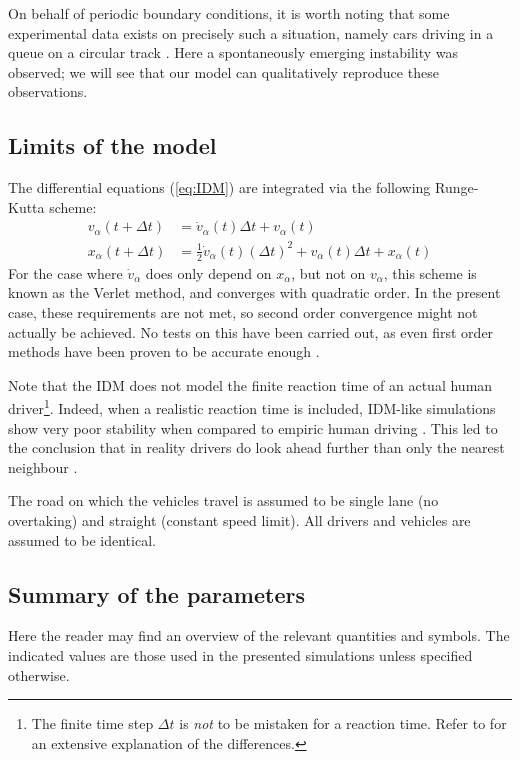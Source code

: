On behalf of periodic boundary conditions, it is worth noting that some experimental data exists on precisely such a situation, namely cars driving in a queue on a circular track  \cite{nakayama2009,tadaki2013}. Here a spontaneously emerging instability was observed; we will see that our model can qualitatively reproduce these observations.


\subsection{Limits of the model}
The differential equations (\ref{eq:IDM}) are integrated via the following Runge-Kutta scheme:
\begin{align*}
v_\alpha(t+\Delta t) &= \dot v_\alpha(t)\Delta t+v_\alpha(t) \\
x_\alpha(t+\Delta t) &= \frac{1}{2}\dot v_\alpha(t) (\Delta t)^2 + v_\alpha(t)\Delta t + x_\alpha(t)
\end{align*}
For the case where $\dot v_\alpha$ does only depend on $x_\alpha$, but not on $v_\alpha$, this scheme is known as the Verlet method, and converges with quadratic order. In the present case, these requirements are not met, so second order convergence might not actually be achieved. No tests on this have been carried out, as even first order methods have been proven to be accurate enough \cite{treiber2015}.

Note that the IDM does not model the finite reaction time of an actual human driver\footnote{The finite time step $\Delta t$ is \emph{not} to be mistaken for a reaction time. Refer to \cite{treiber2006} for an extensive explanation of the differences.}. Indeed, when a realistic reaction time is included, IDM-like simulations show very poor stability when compared to empiric human driving . This led to the conclusion that in reality drivers do look ahead further than only the nearest neighbour \cite{treiber2006}.

The road on which the vehicles travel is assumed to be single lane (no overtaking) and straight (constant speed limit). All drivers and vehicles are assumed to be identical.

\subsection{Summary of the parameters}
Here the reader may find an overview of the relevant quantities and symbols. The indicated values are those used in the presented simulations unless specified otherwise.

